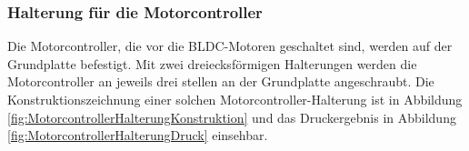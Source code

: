 \newpage

\subsubsection{Halterung für die Motorcontroller}\label{Sec2Sub2SubSub4}

Die Motorcontroller, die vor die BLDC-Motoren geschaltet sind, werden auf der Grundplatte befestigt. Mit zwei dreiecksförmigen Halterungen werden die Motorcontroller an jeweils drei stellen an der Grundplatte angeschraubt. Die Konstruktionszeichnung einer solchen Motorcontroller-Halterung ist in Abbildung \ref{fig:MotorcontrollerHalterungKonstruktion} und das Druckergebnis in Abbildung \ref{fig:MotorcontrollerHalterungDruck} einsehbar.

